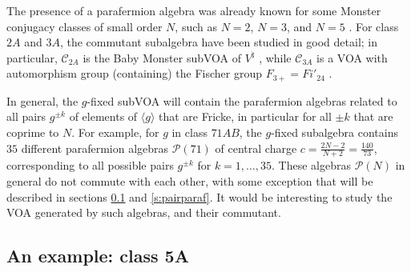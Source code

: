 \documentclass[11pt,reqno]{article}
\newcommand{\calC}{\mathcal{C}}
\newcommand{\paraf}{\mathcal{P}}
\begin{document}
The presence of a parafermion algebra was already known for some Monster conjugacy classes of small order $N$, such as $N=2$, $N=3$, and $N=5$ \cite{HohnLamYamauchi,HoehnLamYamauchi2012McKayE6,LamYamadaYamauchi}. For class $2A$ and $3A$, the commutant subalgebra have been studied in good detail; in particular, $\calC_{2A}$ is the Baby Monster subVOA of $V^\natural$ \cite{HohnLamYamauchi}, while $\calC_{3A}$ is a VOA with automorphism group (containing) the Fischer group $F_{3+}=Fi'_{24}$ \cite{HoehnLamYamauchi2012McKayE6}.

In general, the $g$-fixed subVOA will contain the parafermion algebras related to all pairs $g^{\pm k}$ of elements of $\langle g\rangle$ that are Fricke, in particular for all $\pm k$ that are coprime to $N$. For example, for $g$ in class $71AB$, the $g$-fixed subalgebra contains $35$ different parafermion algebras $\paraf(71)$ of central charge $c=\frac{2N-2}{N+2}=\frac{140}{73}$, corresponding to all possible pairs $g^{\pm k}$ for $k=1,\ldots, 35$. These algebras $\paraf(N)$ in general do not commute with each other, with some exception that will be described in sections \ref{s:5A} and \ref{s:pairparaf}. It would be interesting to study the VOA generated by such algebras, and their commutant. 

\subsection{An example: class 5A} \label{s:5A}
\end{document}
